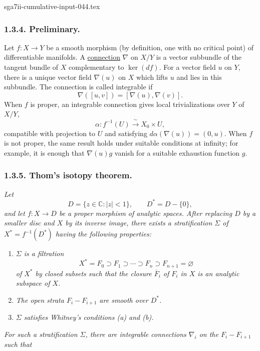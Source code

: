 \begin{filecontents*}{sga7ii-cumulative-input-044.tex}
\subsubsection*{1.3.4. Preliminary.}
Let $f:X\longrightarrow Y$ be a smooth morphism (by definition, one
with no critical point) of differentiable manifolds.  A
\underline{connection} $\nabla$ on $X/Y$ is a vector subbundle of the
tangent bundle of $X$ complementary to $\ker(df)$.  For a vector
field $u$ on $Y$, there is a unique vector field $\nabla(u)$ on $X$
which lifts $u$ and lies in this subbundle.  The connection is called
integrable if
\[
\nabla([u,v])=[\nabla(u),\nabla(v)].
\]
When $f$ is proper, an integrable connection gives local
trivializations over $Y$ of $X/Y$,
\[
\alpha:f^{-1}(U)\xrightarrow{\ \sim\ }X_0\times U,
\]
compatible with projection to $U$ and satisfying
$d\alpha(\nabla(u))=(0,u)$.  When $f$ is not proper, the same result
holds under suitable conditions at infinity; for example, it is
enough that $\nabla(u)g$ vanish for a suitable exhaustion function
$g$.

\subsubsection*{1.3.5. Thom's isotopy theorem.}
\textit{Let
\[
D=\{z\in\mathbb C:|z|<1\},
\qquad D^*=D-\{0\},
\]
and let $f:X\longrightarrow D$ be a proper morphism of analytic
spaces.  After replacing $D$ by a smaller disc and $X$ by its inverse
image, there exists a stratification $\Sigma$ of
$X^*=f^{-1}(D^*)$ having the following properties:}

\begin{enumerate}[label=(\alph*),leftmargin=2.7em]
\item \textit{$\Sigma$ is a filtration
\[
X^*=F_0\supset F_1\supset\cdots\supset F_n
\supset F_{n+1}=\varnothing
\]
of $X^*$ by closed subsets such that the closure $\overline F_i$ of
$F_i$ in $X$ is an analytic subspace of $X$.}

\item \textit{The open strata $F_i-F_{i+1}$ are smooth over $D^*$.}

\item \textit{$\Sigma$ satisfies Whitney's conditions (a) and (b).}
\end{enumerate}

\textit{For such a stratification $\Sigma$, there are integrable
connections $\nabla_i$ on the $F_i-F_{i+1}$ such that}


\end{filecontents*}
